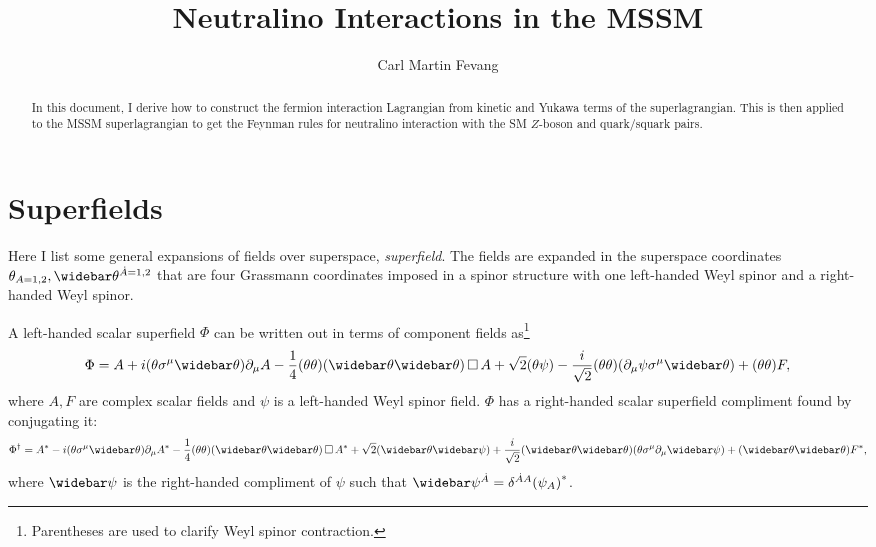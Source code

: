 \documentclass[english, notitlepage]{article}
\title{Neutralino Interactions in the MSSM}
\author{Carl Martin Fevang}
\begin{document}
\maketitle

\begin{abstract}
    \noindent
    In this document, I derive how to construct the fermion interaction Lagrangian from kinetic and Yukawa terms of the superlagrangian.
    This is then applied to the MSSM superlagrangian to get the Feynman rules for neutralino interaction with the SM \(Z\)-boson and quark/squark pairs.
\end{abstract}

\section{Superfields}
    Here I list some general expansions of fields over superspace, \textit{superfield}.
    The fields are expanded in the superspace coordinates \(\theta_{A=1,2}, \wbar{\theta}^{\dot{A}=1,2}\) that are four Grassmann coordinates imposed in a spinor structure with one left-handed Weyl spinor and a right-handed Weyl spinor.

    A left-handed scalar superfield $\Phi$ can be written out in terms of component
    fields as\footnote{Parentheses are used to clarify Weyl spinor contraction.}
    \begin{align}
        \Phi = A + i(\theta\sigma^\mu\wbar\theta) \partial_\mu A - \frac{1}{4} (\theta\theta)(\wbar\theta\wbar\theta) \dA A +
        \sqrt{2} (\theta\psi) - \frac{i}{\sqrt{2}} (\theta\theta) (\partial_\mu \psi \sigma^\mu \wbar\theta) + (\theta\theta) F,
    \end{align}
    where $A, F$ are complex scalar fields and $\psi$ is a left-handed Weyl spinor field.
    $\Phi$ has a right-handed scalar superfield compliment found by conjugating it:
    \begin{align}
        \Phi^\dag = A^* - i(\theta\sigma^\mu\wbar\theta) \partial_\mu A^* - \frac{1}{4} (\theta\theta)(\wbar\theta\wbar\theta) \dA A^* +
        \sqrt{2} (\wbar\theta\wbar\psi) + \frac{i}{\sqrt{2}} (\wbar\theta\wbar\theta)
        (\theta \sigma^\mu \partial_\mu \wbar\psi) + (\wbar\theta\wbar\theta) F^*,
    \end{align}
    where $\wbar\psi$ is the right-handed compliment of $\psi$ such that $\wbar\psi^{\dot A} = \delta^{\dot A A} {(\psi_A)}^*$.
\end{document}
